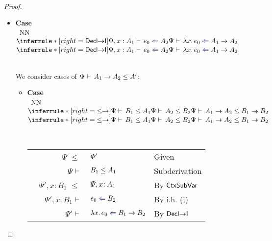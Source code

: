 \documentclass[a4paper]{article}
\makeatletter
\newcommand{\mathcolor}[2]{\text{\textcolor{#1}{\ensuremath{#2}}}}
\newcommand{\arr}{\rightarrow}
\def\CompactJudgments{0}
\newcommand{\entails}{\mathrel{\ifnum\CompactJudgments=1\vdash \else \vdash\,\fi}}
\newcommand{\Lemmaref}[1]{Lemma \ref{#1} (\nameref{#1})}   \newcommand{\Lemref}[1]{\Lemma \ref{#1}}   \newcommand{\Conjectureref}[1]{Conjecture \ref{#1}}
\gdef\xxDerivationProofCaseColor{N}
\newcommand{\DerivationProofCase}[3]{\smallskip
     \item \parbox[t]{100ex}{\textbf{Case } \\[-0.5em]
       $~$\hspace{5ex}
       \if\xxDerivationProofCaseColor N\ensuremath{\Infer{#1}{#2}{#3}}
       \else \colorbox{\xxDerivationProofCaseColor}{\ensuremath{\Infer{#1}{#2}{#3}}}\fi }\nopagebreak \\[-0.8ex]
  }
\newcommand{\BeginProof}{\renewcommand{\arraystretch}{1.1} \begin{tabular}[b]{r@{}r @{} l  l}}
\newcommand{\EndProof}{\end{tabular} \renewcommand{\arraystretch}{\mydefaultarraystretch}}
\newcommand{\Hand}{\text{\Pointinghand~~~~}}
\newcommand{\Pf}[4] {&$#1$ $#2$\, & $#3$ & #4 \\}
\newcommand{\mkpf}[4] {\Pf{#2}{#1\,}{#3}{#4}}
\newcommand{\leqPf}[3] {\mkpf{\leq}{#1}{#2}{#3}}
\newenvironment{llproof}{\BeginProof}{\EndProof}
\newcommand{\AllSym}{\forall}
\newcommand{\xAll}[1]{\AllSym#1}
\newcommand{\All}[1]{\xAll{#1}.\:}
\newcommand{\Infer}[3]{\inferrule*[right={\text{\strut#1}}]{{}#2\mathstrut}{{}#3\mathstrut}}
\newcommand{\lam}[1]{\lambda #1.\,}
\newcommand{\declsubjudg}[3]{\ensuremath{{#1} \entails {#2} \declsubtype {#3}}}
\newcommand{\declsubjudgPf}[4] {\Pf{#1}{\entails}{{#2} \declsubtype {#3}}{#4}}
\newcommand{\chkcolor}{dBlue}
\newcommand{\chk}{\mathrel{\mathcolor{\chkcolor}{\Leftarrow}}}
\newcommand{\declchkjudg}[3]{\ensuremath{{#1} \entails {#2} \chk {#3}}}
\newcommand{\declchkjudgPf}[4]{\Pf{#1}{\entails}{{#2} \chk {#3}}{#4}}
\newcommand{\alltype}[1]{\All{#1}}
\newcommand{\judgetp}[2]{{#1} \entails {#2}}
\newcommand{\rulename}[1]{\text{\normalfont\textsf{#1}}}
\newcommand{\Dsubrulename}[1]{\ensuremath{{\declsubtype}\rulename{#1}}\xspace}
\newcommand{\DsubArr}{\Dsubrulename{\ensuremath{\arr}}}
\newcommand{\Decltyrulename}[1]{\ensuremath{\rulename{Decl#1}}\xspace}
\newcommand{\DeclIntrorulename}[1]{\Decltyrulename{\ensuremath{#1}I}}
\newcommand{\DeclArrIntro}{\DeclIntrorulename{\arr}}
\newcommand{\DeclAllIntro}{\DeclIntrorulename{\AllSym}}
\newcommand{\Ctxsubrulename}[1]{\ensuremath{\rulename{CtxSub#1}}\xspace}
\newcommand{\CtxsubVar}{\Ctxsubrulename{Var}}
\makeatother
\begin{document}
\begin{proof}
\begin{itemize}
\begin{itemize}
                        \smallskip
                        
                        \begin{llproof}
                          \declsubjudgPf{\Psi, \beta}{\alltype{\alpha} A_0}{B}  {Subderivation}
                          \declchkjudgPf{\Psi}{e}{\alltype{\alpha} A_0}   {Given}
                          \declchkjudgPf{\Psi'}{e}{B}   {By i.h. (i)}
                        \Hand  \declchkjudgPf{\Psi'}{e}{\underbrace{\alltype{\beta} B}_{A'}}   {By \DeclAllIntro}
                        \end{llproof}

                  \DerivationProofCase{\DsubAllL}
                        {\judgetp{\Psi}{\tau}
                          \\
                          \declsubjudg{\Psi}{[\tau/\alpha]A_0}{A'}}
                        {\declsubjudg{\Psi}{\alltype{\alpha} A_0}{A'}}

                        \smallskip

                        \begin{llproof}
\declchkjudgPf{\Psi, \alpha}{e}{A_0}   {Subderivation}
                          \declchkjudgPf{\Psi}{e}{[\tau/\alpha]A_0}   {By \Lemmaref{lem:type-substitution}}
                          \declsubjudgPf{\Psi}{[\tau/\alpha]A_0}{A'}   {Subderivation}
                        \Hand  \declchkjudgPf{\Psi'}{e}{A'}   {By i.h. (i)}
                        \end{llproof}

           \end{itemize}


     \DerivationProofCase{\DeclArrIntro}
          {\declchkjudg{\Psi, x : A_1}{e_0}{A_2}
          }
          {\declchkjudg{\Psi}{\lam{x} e_0}{A_1 \arr A_2}}

          We consider cases of $\declsubjudg{\Psi}{A_1 \arr A_2}{A'}$:

          \begin{itemize}
              \DerivationProofCase{\DsubArr}
                   {\declsubjudg{\Psi}{B_1}{A_1}
                    \\
                    \declsubjudg{\Psi}{A_2}{B_2}}
                   {\declsubjudg{\Psi}{A_1 \arr A_2}{B_1 \arr B_2}}

                   \begin{llproof}
                     \leqPf{\Psi}{\Psi'}  {Given}
                     \declsubjudgPf{\Psi}{B_1}{A_1}   {Subderivation}
                     \leqPf{\Psi', x : B_1}{\Psi, x : A_1}  {By \CtxsubVar}
                     \declchkjudgPf{\Psi', x : B_1} {e_0} {B_2}   {By i.h. (i)}
                   \Hand  \declchkjudgPf{\Psi'} {\lam{x} e_0} {B_1 \arr B_2}   {By \DeclArrIntro}
                   \end{llproof}


\end{itemize}
\end{itemize}
\end{proof}
\end{document}
